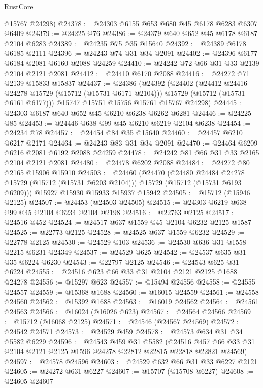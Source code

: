 \begin{lexlean}{RustCore}
\begin{coremodule}
      @15767
      @24298)
@24378 := @24303 @6155 @653 @680 @45 @6178 @6283 @6307 @6409
@24379 := @24225 @76
@24386 := @24379 @640 @652 @45 @6178 @6187 @2104 @6283
@24389 := @24235 @75 @35 @15640
@24392 := @24389 @6178 @6185 @2111
@24396 := @24243 @74 @31 @34 @2091
@24402 := @24396 @6177 @6184 @2081 @6160 @2088 @24259
@24410 := @24242 @72 @66 @31 @33 @2139 @2104 @2121 @2081
@24412 := @24410 @6170 @2088
@24416 := @24272 @71 @2139 @15833 @15837
@24437 := @24386
    (@24392
      (@24402
        (@24412 @24416 @24278 @15729 (@15712 (@15731 @6171 @2104)))
        @15729
        (@15712 (@15731 @6161 @6177)))
      @15747
      @15751
      @15756
      @15761
      @15767
      @24298)
@24445 := @24303 @6187 @640 @652 @45 @6210 @6238 @6262 @6281
@24446 := @24225 @85
@24453 := @24446 @638 @99 @45 @6210 @6219 @2104 @6238
@24454 := @24234 @78
@24457 := @24454 @84 @35 @15640
@24460 := @24457 @6210 @6217 @2171
@24464 := @24243 @83 @31 @34 @2091
@24470 := @24464 @6209 @6216 @2081 @6192 @2088 @24259
@24478 := @24242 @81 @66 @31 @33 @2165 @2104 @2121 @2081
@24480 := @24478 @6202 @2088
@24484 := @24272 @80 @2165 @15906 @15910
@24503 := @24460
    (@24470
      (@24480 @24484 @24278 @15729 (@15712 (@15731 @6203 @2104)))
      @15729
      (@15712 (@15731 @6193 @6209)))
    @15927
    @15930
    @15933
    @15937
    @15942
@24505 := @15712 (@15946 @2125)
@24507 := @24453 (@24503 @24505)
@24515 := @24303 @6219 @638 @99 @45 @2104 @6234 @2104 @2198
@24516 := @22763 @2125
@24517 := @24516 @452
@24524 := @24517 @637 @1559 @45 @2104 @6232 @2125 @1587
@24525 := @22773 @2125
@24528 := @24525 @637 @1559 @6232
@24529 := @22778 @2125
@24530 := @24529 @103
@24536 := @24530 @636 @31 @1558 @2215 @6231 @24349
@24537 := @24529 @625
@24542 := @24537 @635 @31 @35 @6224 @6230
@24543 := @22797 @2125
@24546 := @24543 @625 @31 @6224
@24555 := @24516 @623 @66 @33 @31 @2104 @2121 @2125 @1688 @24278
@24556 := @15297 @623
@24557 := @15494 @24556
@24558 := @24555 @24557
@24559 := @15368 @1688
@24560 := @16015 @24559
@24561 := @24558 @24560
@24562 := @15392 @1688
@24563 := @16019 @24562
@24564 := @24561 @24563
@24566 := @16024 (@16026 @623)
@24567 := @24564 @24566
@24569 := @15712 (@16068 @2125)
@24571 := @24546 (@24567 @24569)
@24572 := @24542 @24571
@24573 := @24529 @459
@24578 := @24573 @634 @31 @34 @5582 @6229
@24596 := @24543
    @459
    @31
    @5582
    (@24516 @457 @66 @33 @31 @2104 @2121 @2125 @1596 @24278 @22812 @22815 @22818 @22821 @24569)
@24597 := @24578 @24596
@24603 := @24529 @632 @66 @31 @33 @6227 @2121
@24605 := @24272 @631 @6227
@24607 := @15707 (@15708 @6227)
@24608 := @24605 @24607

\end{coremodule}
\end{lexlean}
